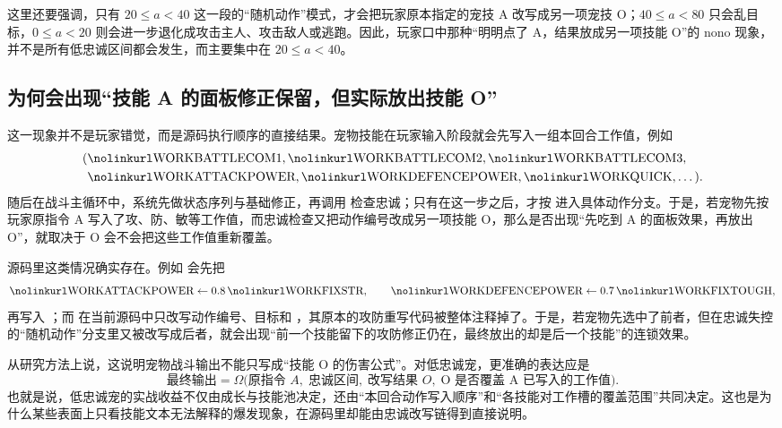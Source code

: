 这里还要强调，只有 $20 \le a < 40$ 这一段的“随机动作”模式，才会把玩家原本指定的宠技 A 改写成另一项宠技 O；$40 \le a < 80$ 只会乱目标，$0 \le a < 20$ 则会进一步退化成攻击主人、攻击敌人或逃跑。因此，玩家口中那种“明明点了 A，结果放成另一项技能 O”的 nono 现象，并不是所有低忠诚区间都会发生，而主要集中在 $20 \le a < 40$。

\subsection{为何会出现“技能 A 的面板修正保留，但实际放出技能 O”}

这一现象并不是玩家错觉，而是源码执行顺序的直接结果。宠物技能在玩家输入阶段就会先写入一组本回合工作值，例如
\begin{equation}
    \begin{aligned}
        (&\code{WORKBATTLECOM1},\code{WORKBATTLECOM2},\code{WORKBATTLECOM3},\\
         &\code{WORKATTACKPOWER},\code{WORKDEFENCEPOWER},\code{WORKQUICK},\dots).
    \end{aligned}
\end{equation}
随后在战斗主循环中，系统先做状态序列与基础修正，再调用  检查忠诚；只有在这一步之后，才按  进入具体动作分支。于是，若宠物先按玩家原指令 A 写入了攻、防、敏等工作值，而忠诚检查又把动作编号改成另一项技能 O，那么是否出现“先吃到 A 的面板效果，再放出 O”，就取决于 O 会不会把这些工作值重新覆盖。

源码里这类情况确实存在。例如  会先把
\begin{equation}
    \code{WORKATTACKPOWER} \leftarrow 0.8 \, \code{WORKFIXSTR},
    \qquad
    \code{WORKDEFENCEPOWER} \leftarrow 0.7 \, \code{WORKFIXTOUGH},
\end{equation}
再写入 ；而  在当前源码中只改写动作编号、目标和 ，其原本的攻防重写代码被整体注释掉了。于是，若宠物先选中了前者，但在忠诚失控的“随机动作”分支里又被改写成后者，就会出现“前一个技能留下的攻防修正仍在，最终放出的却是后一个技能”的连锁效果。

从研究方法上说，这说明宠物战斗输出不能只写成“技能 O 的伤害公式”。对低忠诚宠，更准确的表达应是
\begin{equation}
    \text{最终输出} = \Omega\bigl(\text{原指令 }A,\; \text{忠诚区间},\; \text{改写结果 }O,\; \text{O 是否覆盖 A 已写入的工作值}\bigr).
\end{equation}
也就是说，低忠诚宠的实战收益不仅由成长与技能池决定，还由“本回合动作写入顺序”和“各技能对工作槽的覆盖范围”共同决定。这也是为什么某些表面上只看技能文本无法解释的爆发现象，在源码里却能由忠诚改写链得到直接说明。

